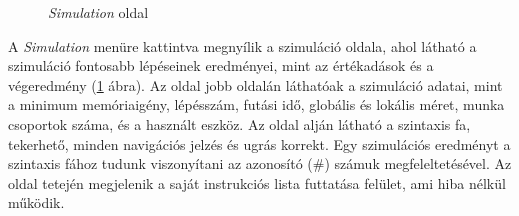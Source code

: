 \begin{figure}[h!]
\centering
{}
\caption{\textit{Simulation} oldal}
\label{fig:sim}
\end{figure}


A \textit{Simulation} menüre kattintva megnyílik a szimuláció oldala, ahol látható a szimuláció fontosabb lépéseinek eredményei, mint az értékadások és a végeredmény (\ref{fig:sim} ábra). Az oldal jobb oldalán láthatóak a szimuláció adatai, mint a minimum memóriaigény, lépésszám, futási idő, globális és lokális méret, munka csoportok száma, és a használt eszköz. Az oldal alján látható a szintaxis fa, tekerhető, minden navigációs jelzés és ugrás korrekt. Egy szimulációs eredményt a szintaxis fához tudunk viszonyítani az azonosító (\#) számuk megfeleltetésével.
Az oldal tetején megjelenik a saját instrukciós lista futtatása felület, ami hiba nélkül működik.
